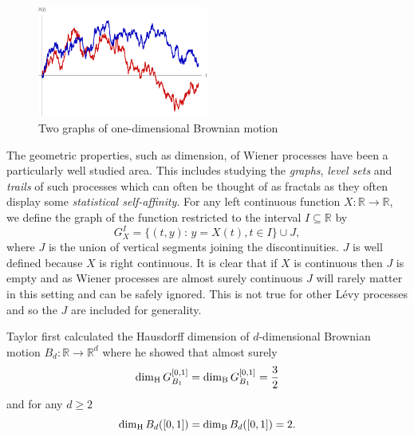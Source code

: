 \begin{figure}[h]
    \centering
	\includegraphics[width=0.5\textwidth]{pics/ch-brownian/wiener_process.pdf}
	\caption{\label{fig:brownianmotion}Two graphs of one-dimensional Brownian motion}
\end{figure}

The geometric properties, such as dimension, of Wiener processes have been a particularly well studied area. This includes studying the \emph{graphs}, \emph{level sets} and \emph{trails} of such processes which can often be thought of as fractals as they often display some \emph{statistical self-affinity}. For any left continuous function $X:\mathbb{R}\to\mathbb{R}$, we define the graph of the function restricted to the interval $I \subseteq \mathbb{R}$ by
\[
G^{I}_{X}=\{(t,y) \colon \, y=X(t),t\in I\}\cup J,
\]
where $J$ is the union of vertical segments joining the discontinuities. $J$ is well defined because $X$ is right continuous. It is clear that if $X$ is continuous then $J$ is empty and as Wiener processes are almost surely continuous $J$ will rarely matter in this setting and can be safely ignored. This is not true for other L\'evy processes and so the $J$ are included for generality.

Taylor \cite{Ta} first calculated the Hausdorff dimension of $d$-dimensional Brownian motion $B_d:\mathbb{R}\to\mathbb{R}^d$ where he showed that almost surely
\[
\dim_\text{H} G_{B_1}^{[0,1]} = \dim_{\textup{B}}  G_{B_1}^{[0,1]} = \frac{3}{2}         
\]
and for any $d\ge 2$
\[
\dim_\text{H} B_d([0,1]) = \dim_{\textup{B}} B_d([0,1]) =  2.
\]


